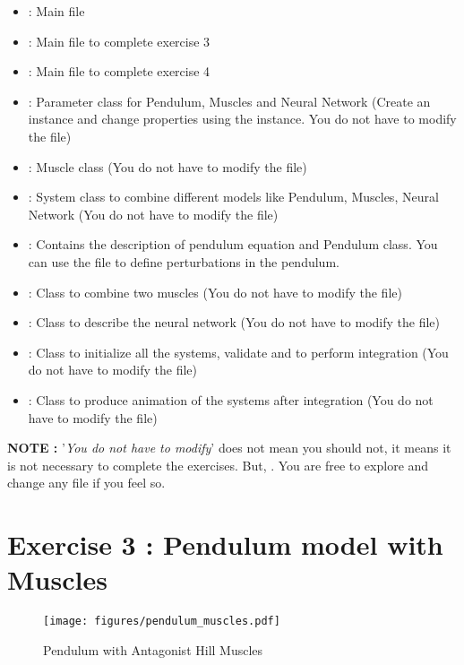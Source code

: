 \documentclass{cmc}
\begin{document}
\begin{itemize}
\item {} : Main file
\item {} : Main file to complete exercise 3
\item {} : Main file to complete exercise 4
\item {} : Parameter class for Pendulum,
  Muscles and Neural Network (Create an instance and change properties
  using the instance. You do not have to modify the file)
\item {} : Muscle class (You do not have to modify
  the file)
\item {} : System class to combine different models
  like Pendulum, Muscles, Neural Network (You do not have to modify
  the file)
\item {} : Contains the description of
  pendulum equation and Pendulum class. You can use the file to define
  perturbations in the pendulum.
\item {} : Class to combine two muscles (You do
  not have to modify the file)
\item {} : Class to describe the neural network
  (You do not have to modify the file)
\item {} : Class to initialize all the
  systems, validate and to perform integration (You do not have to
  modify the file)
\item {} : Class to produce animation of the
  systems after integration (You do not have to modify the file)
\end{itemize}

\textbf{NOTE : } '\textit{You do not have to modify}' does not mean
you should not, it means it is not necessary to complete the
exercises. But, . You are free to explore
and change any file if you feel so.

\section*{Exercise 3 : Pendulum model with Muscles}
\label{sec:question-1}

\begin{figure}[H]
  \centering \texttt{[image: figures/pendulum\_muscles.pdf]}
  \caption{Pendulum with Antagonist Hill Muscles}
  \label{fig:p_muscles}
\end{figure}
\end{document}
